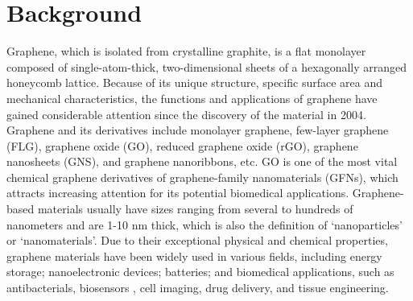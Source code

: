 \documentclass[twoside,twocolumn,9pt]{article}
\begin{document}
\section*{}
\vspace{-1cm}








\section{Background}
Graphene, which is isolated from crystalline graphite, is a flat monolayer composed of single-atom-thick, two-dimensional sheets of a hexagonally arranged honeycomb lattice. Because of its unique structure, specific surface area and mechanical characteristics, the functions and applications of graphene have gained considerable attention since the discovery of the material in 2004. Graphene and its derivatives include monolayer graphene, few-layer graphene (FLG), graphene oxide (GO), reduced graphene oxide (rGO), graphene nanosheets (GNS), and graphene nanoribbons, etc. GO is one of the most vital chemical graphene derivatives of graphene-family nanomaterials (GFNs), which attracts increasing attention for its potential biomedical applications. Graphene-based materials usually have sizes ranging from several to hundreds of nanometers and are 1-10 nm thick, which is also the definition of ‘nanoparticles’ or ‘nanomaterials’. Due to their exceptional physical and chemical properties, graphene materials have been widely used in various fields, including energy storage; nanoelectronic devices; batteries; and biomedical applications, such as antibacterials, biosensors , cell imaging, drug delivery, and tissue engineering.
\end{document}
